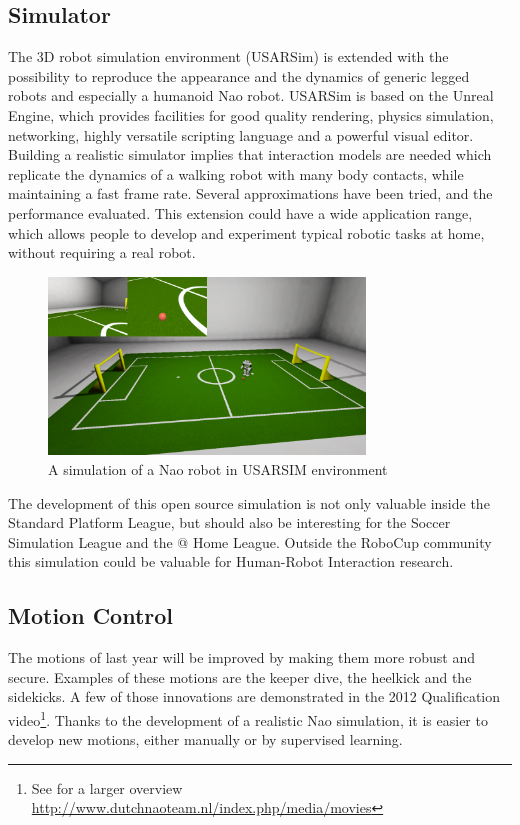 \documentclass[11pt]{article}
\begin{document}
\subsection{Simulator}
The 3D robot simulation environment (USARSim) is extended with the possibility to reproduce the appearance and the dynamics of generic legged robots and especially a humanoid Nao robot. USARSim is based on the Unreal Engine, which provides facilities for good quality rendering, physics simulation, networking, highly versatile scripting language and a powerful visual editor. Building a realistic simulator implies that interaction models are needed which replicate the dynamics of a walking robot with many body contacts, while maintaining a fast frame rate. Several approximations have been tried, and the performance evaluated. This extension could have a wide application range, which allows people to develop and experiment typical robotic tasks at home, without requiring a real robot.
\begin{figure}[!ht]
\centering
\includegraphics[width = 0.75\textwidth]{sim2012.png} %
\caption{A simulation of a Nao robot in USARSIM environment}
\end{figure}
The development of this open source simulation is not only valuable inside the Standard Platform League, but should also be interesting for the Soccer Simulation League and the @ Home League. Outside the RoboCup community this simulation could be valuable for Human-Robot Interaction research.
\subsection{Motion Control}
The motions of last year will be improved by making them more robust and secure. Examples of these motions are the keeper dive, the heelkick and the sidekicks. A few of those innovations are demonstrated in the 2012 Qualification video\footnote{See for a larger overview \url{http://www.dutchnaoteam.nl/index.php/media/movies}}. Thanks to the development of a realistic Nao simulation, it is easier to develop new motions, either manually or by supervised learning.
\end{document}
